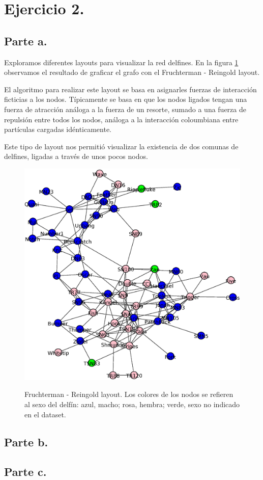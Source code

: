 \documentclass[11pt, spanish]{article}
\begin{document}
\section{Ejercicio 2.}

\subsection{Parte a.}

\par Exploramos diferentes layouts para visualizar la red delfines.
En la figura \ref{fig:Layout_delfines} observamos el resultado de graficar
el grafo con el Fruchterman - Reingold layout. 
\par El algoritmo para realizar este layout se basa en asignarles fuerzas de interacción ficticias a los nodos. Típicamente se basa en que los nodos ligados tengan una fuerza de atracción análoga a la fuerza de un resorte, sumado a una fuerza de repulsión entre todos los nodos, análoga a la interacción coloumbiana entre partículas cargadas idénticamente.
\par Este tipo de layout nos permitió visualizar la existencia de dos comunas de delfines, ligadas a través de unos pocos nodos.

\begin{figure}[h]
\centering
\includegraphics[scale = 0.50]{figuras/FrutRein}
\label{fig:Layout_delfines}
\caption{Fruchterman - Reingold layout. Los colores de los nodos se refieren al sexo del delfín: azul, macho; rosa, hembra; verde, sexo no indicado en el dataset.}
\end{figure}

\subsection{Parte b.}

\subsection{Parte c.}
\end{document}
